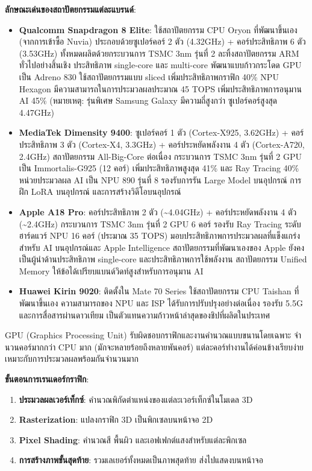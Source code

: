 \textbf{ลักษณะเด่นของสถาปัตยกรรมแต่ละแบรนด์}:

\begin{itemize}
  \item \textbf{Qualcomm Snapdragon 8 Elite}: ใช้สถาปัตยกรรม CPU Oryon ที่พัฒนาขึ้นเอง (จากการเข้าซื้อ Nuvia) ประกอบด้วยซูเปอร์คอร์ 2 ตัว (4.32GHz) + คอร์ประสิทธิภาพ 6 ตัว (3.53GHz) ทั้งหมดผลิตด้วยกระบวนการ TSMC 3nm รุ่นที่ 2 ละทิ้งสถาปัตยกรรม ARM ทั่วไปอย่างสิ้นเชิง ประสิทธิภาพ single-core และ multi-core พัฒนาแบบก้าวกระโดด GPU เป็น Adreno 830 ใช้สถาปัตยกรรมแบบ sliced เพิ่มประสิทธิภาพกราฟิก 40\% NPU Hexagon มีความสามารถในการประมวลผลประมาณ 45 TOPS เพิ่มประสิทธิภาพการอนุมาน AI 45\% (หมายเหตุ: รุ่นพิเศษ Samsung Galaxy มีความถี่สูงกว่า ซูเปอร์คอร์สูงสุด 4.47GHz)
  \item \textbf{MediaTek Dimensity 9400}: ซูเปอร์คอร์ 1 ตัว (Cortex-X925, 3.62GHz) + คอร์ประสิทธิภาพ 3 ตัว (Cortex-X4, 3.3GHz) + คอร์ประหยัดพลังงาน 4 ตัว (Cortex-A720, 2.4GHz) สถาปัตยกรรม All-Big-Core ต่อเนื่อง กระบวนการ TSMC 3nm รุ่นที่ 2 GPU เป็น Immortalis-G925 (12 คอร์) เพิ่มประสิทธิภาพสูงสุด 41\% และ Ray Tracing 40\% หน่วยประมวลผล AI เป็น NPU 890 รุ่นที่ 8 รองรับการรัน Large Model บนอุปกรณ์ การฝึก LoRA บนอุปกรณ์ และการสร้างวิดีโอบนอุปกรณ์
  \item \textbf{Apple A18 Pro}: คอร์ประสิทธิภาพ 2 ตัว (\textasciitilde{}4.04GHz) + คอร์ประหยัดพลังงาน 4 ตัว (\textasciitilde{}2.4GHz) กระบวนการ TSMC 3nm รุ่นที่ 2 GPU 6 คอร์ รองรับ Ray Tracing ระดับฮาร์ดแวร์ NPU 16 คอร์ (ประมาณ 35 TOPS) มอบประสิทธิภาพการประมวลผลที่แข็งแกร่งสำหรับ AI บนอุปกรณ์และ Apple Intelligence สถาปัตยกรรมที่พัฒนาเองของ Apple ยังคงเป็นผู้นำด้านประสิทธิภาพ single-core และประสิทธิภาพการใช้พลังงาน สถาปัตยกรรม Unified Memory ให้ข้อได้เปรียบแบนด์วิดท์สูงสำหรับการอนุมาน AI
  \item \textbf{Huawei Kirin 9020}: ติดตั้งใน Mate 70 Series ใช้สถาปัตยกรรม CPU Taishan ที่พัฒนาขึ้นเอง ความสามารถของ NPU และ ISP ได้รับการปรับปรุงอย่างต่อเนื่อง รองรับ 5.5G และการสื่อสารผ่านดาวเทียม เป็นตัวแทนความก้าวหน้าล่าสุดของชิปที่ผลิตในประเทศ
\end{itemize}


GPU (Graphics Processing Unit) รับผิดชอบกราฟิกและงานคำนวณแบบขนานโดยเฉพาะ จำนวนคอร์มากกว่า CPU มาก (มักจะหลายร้อยถึงหลายพันคอร์) แต่ละคอร์ทำงานได้ค่อนข้างเรียบง่าย เหมาะกับการประมวลผลพร้อมกันจำนวนมาก

\textbf{ขั้นตอนการเรนเดอร์กราฟิก}:

\begin{enumerate}
  \item \textbf{ประมวลผลเวอร์เท็กซ์}: คำนวณพิกัดตำแหน่งของแต่ละเวอร์เท็กซ์ในโมเดล 3D
  \item \textbf{Rasterization}: แปลงกราฟิก 3D เป็นพิกเซลบนหน้าจอ 2D
  \item \textbf{Pixel Shading}: คำนวณสี พื้นผิว และเอฟเฟกต์แสงสำหรับแต่ละพิกเซล
  \item \textbf{การสร้างภาพขั้นสุดท้าย}: รวมเลเยอร์ทั้งหมดเป็นภาพสุดท้าย ส่งไปแสดงบนหน้าจอ
\end{enumerate}

